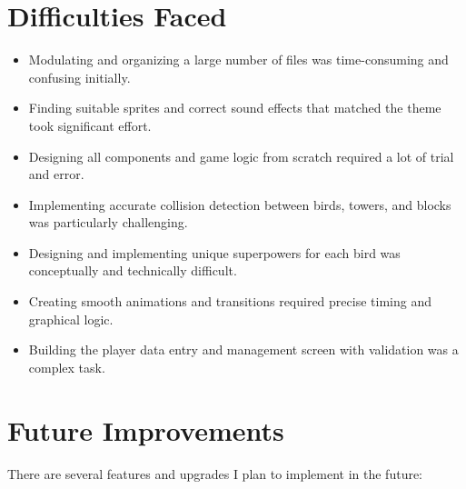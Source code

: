 \documentclass[10pt]{article}
\begin{document}
\section{Difficulties Faced}\label{sec:difficulties}
\begin{itemize}
    \item Modulating and organizing a large number of files was time-consuming and confusing initially.
    \item Finding suitable sprites and correct sound effects that matched the theme took significant effort.
    \item Designing all components and game logic from scratch required a lot of trial and error.
    \item Implementing accurate collision detection between birds, towers, and blocks was particularly challenging.
    \item Designing and implementing unique superpowers for each bird was conceptually and technically difficult.
    \item Creating smooth animations and transitions required precise timing and graphical logic.
    \item Building the player data entry and management screen with validation was a complex task.
\end{itemize}
\section{Future Improvements}\label{sec:future}
There are several features and upgrades I plan to implement in the future:
\end{document}
